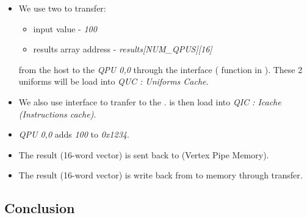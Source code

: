 \begin{itemize}
	\item We use two  to transfer:
		\begin{itemize}
			\item input value - \emph{100}
			\item results array address - \emph{results[NUM\_QPUS][16]}
		\end{itemize}
		from the host \cpu{} to the \emph{QPU 0,0} through the \mail{} interface ( function in ). These 2 uniforms will be load into \emph{QUC : Uniforms Cache}.
	\item We also use \mail{} interface to tranfer  to the .  is then load into \emph{QIC : Icache (Instructions cache)}.
	\item \emph{QPU 0,0} adds \emph{100} to \emph{0x1234}.
	\item The result (16-word vector) is sent back to  (Vertex Pipe Memory).
	\item The result (16-word vector) is write back from  to \ram{} memory through  transfer.
\end{itemize}


\subsection{Conclusion}

